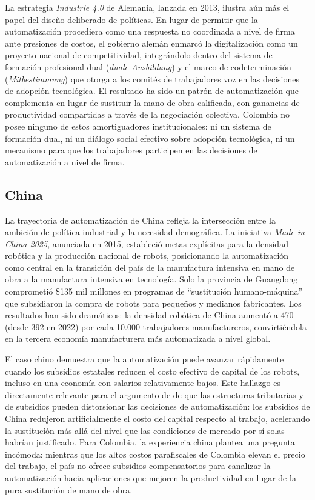 \documentclass{article}
\begin{document}
La estrategia \textit{Industrie 4.0} de Alemania, lanzada en 2013, ilustra a\'un m\'as el papel del dise\~no deliberado de pol\'iticas. En lugar de permitir que la automatizaci\'on procediera como una respuesta no coordinada a nivel de firma ante presiones de costos, el gobierno alem\'an enmarc\'o la digitalizaci\'on como un proyecto nacional de competitividad, integr\'andolo dentro del sistema de formaci\'on profesional dual (\textit{duale Ausbildung}) y el marco de codeterminaci\'on (\textit{Mitbestimmung}) que otorga a los comit\'es de trabajadores voz en las decisiones de adopci\'on tecnol\'ogica. El resultado ha sido un patr\'on de automatizaci\'on que complementa en lugar de sustituir la mano de obra calificada, con ganancias de productividad compartidas a trav\'es de la negociaci\'on colectiva. Colombia no posee ninguno de estos amortiguadores institucionales: ni un sistema de formaci\'on dual, ni un di\'alogo social efectivo sobre adopci\'on tecnol\'ogica, ni un mecanismo para que los trabajadores participen en las decisiones de automatizaci\'on a nivel de firma.

\subsection{China}
\label{subsec:china}

La trayectoria de automatizaci\'on de China refleja la intersecci\'on entre la ambici\'on de pol\'itica industrial y la necesidad demogr\'afica. La iniciativa \textit{Made in China 2025}, anunciada en 2015, estableci\'o metas expl\'icitas para la densidad rob\'otica y la producci\'on nacional de robots, posicionando la automatizaci\'on como central en la transici\'on del pa\'is de la manufactura intensiva en mano de obra a la manufactura intensiva en tecnolog\'ia. Solo la provincia de Guangdong comprometi\'o \$135 mil millones en programas de ``sustituci\'on humano-m\'aquina'' que subsidiaron la compra de robots para peque\~nos y medianos fabricantes. Los resultados han sido dram\'aticos: la densidad rob\'otica de China aument\'o a 470 (desde 392 en 2022) por cada 10.000 trabajadores manufactureros, convirti\'endola en la tercera econom\'ia manufacturera m\'as automatizada a nivel global.

El caso chino demuestra que la automatizaci\'on puede avanzar r\'apidamente cuando los subsidios estatales reducen el costo efectivo de capital de los robots, incluso en una econom\'ia con salarios relativamente bajos. Este hallazgo es directamente relevante para el argumento de \cite{acemoglu2020taxes} de que las estructuras tributarias y de subsidios pueden distorsionar las decisiones de automatizaci\'on: los subsidios de China redujeron artificialmente el costo del capital respecto al trabajo, acelerando la sustituci\'on m\'as all\'a del nivel que las condiciones de mercado por s\'i solas habr\'ian justificado. Para Colombia, la experiencia china plantea una pregunta inc\'omoda: mientras que los altos costos parafiscales de Colombia elevan el precio del trabajo, el pa\'is no ofrece subsidios compensatorios para canalizar la automatizaci\'on hacia aplicaciones que mejoren la productividad en lugar de la pura sustituci\'on de mano de obra.
\end{document}

